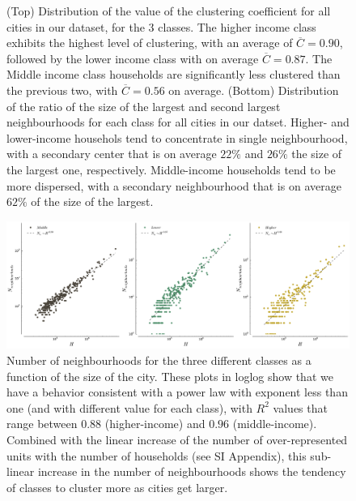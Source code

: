 \begin{figure}
    \caption{(Top) Distribution of the value of the clustering coefficient for
        all cities in our dataset, for the 3 classes. The higher income class
        exhibits the highest level of clustering, with an average of
        $\overline{C} = 0.90$, followed by the lower income class with on
        average $\overline{C} = 0.87$. The Middle income class households are
        significantly less clustered than the previous two, with $\overline{C} =
        0.56$ on average.  (Bottom) Distribution of the ratio of the size of the
        largest and second largest neighbourhoods for each class for all cities in our
        datset. Higher- and lower-income househols tend to concentrate in single
        neighbourhood, with a secondary center that is on average $22\%$ and
        $26\%$ the size of the largest one, respectively. Middle-income
        households tend to be more dispersed, with a secondary neighbourhood that is on
        average $62\%$ of the size of the largest.} \label{fig:clustering} 
\end{figure}


\begin{figure}
    \centering
    \includegraphics[width=\textwidth]{gfx/chapter-segregation/figure7.pdf}
    \caption{Number of neighbourhoods for the three different classes as a
    function of the size of the city. These plots in loglog show that
    we have a behavior consistent with a power law with exponent less
    than one (and with different value for each class), with $R^2$ values that
    range between $0.88$ (higher-income) and $0.96$ (middle-income). Combined with the linear
    increase of the number of over-represented units with the number of
    households (see SI Appendix),
this sub-linear increase in the number of neighbourhoods shows the tendency of
classes to cluster more as cities get larger.\label{fig:number_clusters_class}}
\end{figure}

